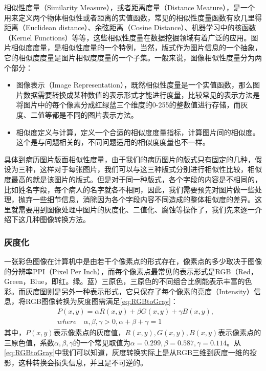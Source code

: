 相似性度量（Similarity Measure）\citep{lin1998information}，或者距离度量（Distance Meature），是一个用来定义两个物体相似性或者距离的实值函数\citep{singhal2001modern}，常见的相似性度量函数有欧几里得距离（Euclidean distance）\citep{wiki:Euclidean-distance}、余弦距离（Cosine Distance）\citep{wiki:Cosine-distance}、机器学习中的核函数（Kernel Functions）\citep{hofmann2008kernel}等等，这些相似性度量在数据挖掘领域有着广泛的应用\citep{tan2006introduction}。图片相似度度量，是相似性度量的一个特例，当然，版式作为图片信息的一个抽象，它的相似度度量是图片相似度度量的一个子集。一般来说，图像相似性度量分为两个部分\citep{goldberger2003efficient}：
\begin{itemize}
  \item 图像表示（Image Representation），既然相似性度量是一个实值函数，那么图片数据需要转换成某种数值的表示形式才能进行度量，比较常见的表示方法是将图片中的每个像素分成红绿蓝三个维度的0-255的整数值进行存储，而灰度、二值等都是不同的图片表示方法。
  \item 相似度定义与计算，定义一个合适的相似度度量指标，计算图片间的相似度。这个是与问题相关的，不同问题适用的相似度度量也不一样。
\end{itemize}
具体到病历图片版面相似性度量，由于我们的病历图片的版式只有固定的几种，假设为三种，这样对于每张图片，我们可以与这三种版式分别进行相似性比较，相似度最高的就是该图片的版式。但是对于同一种版式，各个字段的内容是不相同的，比如姓名字段，每个病人的名字就各不相同，因此，我们需要预先对图片做一些处理，抛弃一些细节信息，消除因为各个字段内容不同造成的整体相似度的差异。这里就需要用到图像处理中图片的灰度化、二值化、腐蚀等操作了，我们先来逐一介绍下这几种图像转换方法。

\subsubsection*{灰度化}
\label{sub:灰度化}
一张彩色图像在计算机中是由若干个像素点的形式存在，像素点的多少取决于图像的分辨率PPI（Pixel Per Inch），而每个像素点最常见的表示形式是RGB（Red，Green，Blue，即红。绿。蓝）三原色，三原色的不同组合比例能表示丰富的色彩。而灰度图则是另外一种表示形式，它只保存了每个像素的亮度（Intensity）信息，将RGB图像转换为灰度图需满足\autoref{eq:RGBtoGray}：
\begin{equation} \label{eq:RGBtoGray}
		\begin{split}
& P(x,y) = \alpha R(x,y) + \beta G(x,y) + \gamma B(x,y),  \\
& where \quad \alpha,\beta,\gamma > 0,\alpha + \beta + \gamma = 1
		\end{split}
\end{equation}
其中，$P(x,y)$表示像素点的灰度值，$R(x,y),G(x,y),B(x,y)$表示像素点的三原色值，系数$\alpha,\beta,\gamma$的一个常见取值为$\alpha=0.299,\beta=0.587,\gamma=0.114$。从\autoref{eq:RGBtoGray}中我们可以知道，灰度转换实际上是从RGB三维到灰度一维的投影，这种转换会损失信息，并且是不可逆的。

